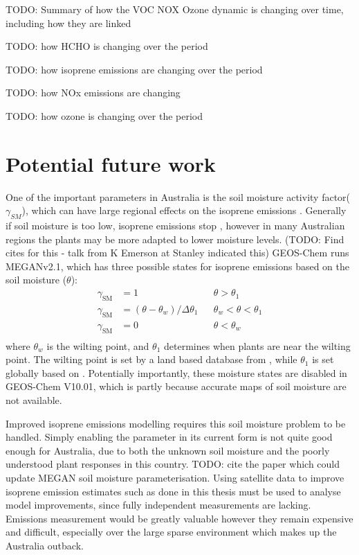   TODO: Summary of how the VOC NOX Ozone dynamic is changing over time, including how they are linked
  
  TODO: how HCHO is changing over the period

  TODO: how isoprene emissions are changing over the period
  
  TODO: how NOx emissions are changing
  
  TODO: how ozone is changing over the period
  
\section{Potential future work}
\label{Conclusions:future}
  
  One of the important parameters in Australia is the soil moisture activity factor($\gamma_{SM}$), which can have large regional effects on the isoprene emissions \parencite{Sindelarova2014,Bauwens2016}.
  Generally if soil moisture is too low, isoprene emissions stop \parencite{Pegoraro2004,Niinemets2010}, however in many Australian regions the plants may be more adapted to lower moisture levels. (TODO: Find cites for this - talk from K Emerson at Stanley indicated this)
  GEOS-Chem runs MEGANv2.1, which has three possible states for isoprene emissions based on the soil moisture ($\theta$):
  \begin{align*}
  \gamma_\mathrm{SM} & = 1 && \theta > \theta_1 \\
  \gamma_\mathrm{SM} & = (\theta-\theta_w)/\Delta\theta_1  && \theta_w < \theta < \theta_1 \\
  \gamma_\mathrm{SM} & = 0 && \theta < \theta_w \\
  \end{align*}
  where $\theta_w$ is the wilting point, and $\theta_1$ determines when plants are near the wilting point.
  The wilting point is set by a land based database from \textcite{Chen2001}, while $\theta_1$ is set globally based on \textcite{Pegoraro2004}.
  Potentially importantly, these moisture states are disabled in GEOS-Chem V10.01, which is partly because accurate maps of soil moisture are not available.
  
  Improved isoprene emissions modelling requires this soil moisture problem to be handled.
  Simply enabling the parameter in its current form is not quite good enough for Australia, due to both the unknown soil moisture and the poorly understood plant responses in this country.
  TODO: cite the paper which could update MEGAN soil moisture parameterisation.
  Using satellite data to improve isoprene emission estimates such as done in this thesis must be used to analyse model improvements, since fully independent measurements are lacking.
  Emissions measurement would be greatly valuable however they remain expensive and difficult, especially over the large sparse environment which makes up the Australia outback.